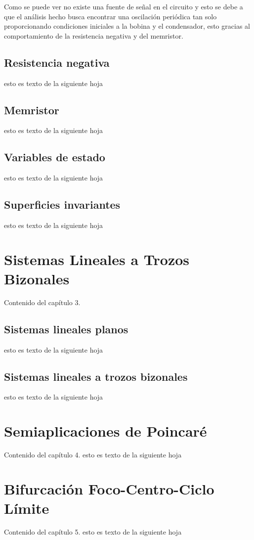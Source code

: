 \documentclass[12pt,a4paper]{report} %
\begin{document}
	Como se puede ver no existe una fuente de señal en el circuito y esto se debe a que el análisis hecho busca encontrar una oscilación periódica tan solo proporcionando condiciones iniciales a la bobina y el condensador, esto gracias al comportamiento de la resistencia negativa y del memristor.
	\newpage
	\section{Resistencia negativa}
	esto es texto de la siguiente hoja
	\newpage
	\section{Memristor}
	esto es texto de la siguiente hoja
	\newpage
	\section{Variables de estado}
	esto es texto de la siguiente hoja
	\newpage
	\section{Superficies invariantes}
	esto es texto de la siguiente hoja
	
	\chapter{Sistemas Lineales a Trozos Bizonales}
	Contenido del capítulo 3.
	\newpage
	\section{Sistemas lineales planos}
	esto es texto de la siguiente hoja
	\newpage
	\section{Sistemas lineales a trozos bizonales}
	esto es texto de la siguiente hoja
	
	\chapter{Semiaplicaciones de Poincaré}
	Contenido del capítulo 4.
	\newpage
	esto es texto de la siguiente hoja
	
	\chapter{Bifurcación Foco-Centro-Ciclo Límite}
	Contenido del capítulo 5.
	\newpage
	esto es texto de la siguiente hoja
	
\end{document}
